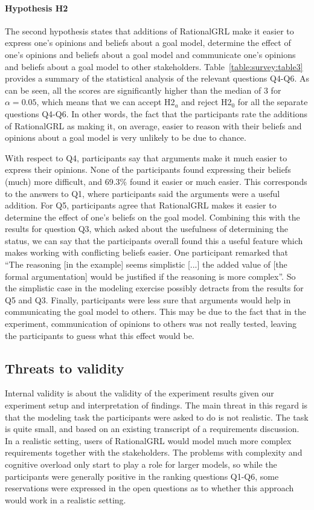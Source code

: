 \paragraph{Hypothesis H2}
The second hypothesis states that additions of RationalGRL make it easier to express one's opinions and beliefs about a goal model, determine the effect of one's opinions and beliefs about a goal model and communicate one's opinions and beliefs about a goal model to other stakeholders. Table~\ref{table:survey:table3} provides a summary of the statistical analysis of the relevant questions Q4-Q6. As can be seen, all the scores are significantly higher than the median of 3 for $\alpha = 0.05$, which means that we can accept H2$_{a}$ and reject H2$_{0}$ for all the separate questions Q4-Q6. In other words, the fact that the participants rate the additions of RationalGRL as making it, on average, easier to reason with their beliefs and opinions about a goal model is very unlikely to be due to chance. 

With respect to Q4, participants say that arguments make it much easier to express their opinions. None of the participants found expressing their beliefs (much) more difficult, and 69.3\% found it easier or much easier. This corresponds to the answers to Q1, where participants said the arguments were a useful addition. For Q5, participants agree that RationalGRL makes it easier to determine the effect of one's beliefs on the goal model. Combining this with the results for question Q3, which asked about the usefulness of determining the status, we can say that the participants overall found this a useful feature which makes working with conflicting beliefs easier. One participant remarked that ``The reasoning [in the example] seems simplistic [...] the added value of [the formal argumentation] would be justified if the reasoning is more complex''. So the simplistic case in the modeling exercise possibly detracts from the results for Q5 and Q3. Finally, participants were less sure that arguments would help in communicating the goal model to others. This may be due to the fact that in the experiment, communication of opinions to others was not really tested, leaving the participants to guess what this effect would be.  

\subsection{Threats to validity}
Internal validity is about the validity of the experiment results given our experiment setup and interpretation of findings. The main threat in this regard is that the modeling task the participants were asked to do is not realistic. The task is quite small, and based on an existing transcript of a requirements discussion. In a realistic setting, users of RationalGRL would model much more complex requirements together with the stakeholders. The problems with complexity and cognitive overload only start to play a role for larger models, so while the participants were generally positive in the ranking questions Q1-Q6, some reservations were expressed in the open questions as to whether this approach would work in a realistic setting. 

